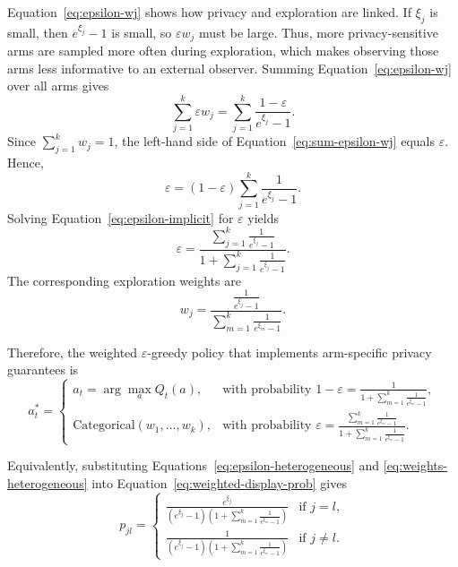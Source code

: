 \documentclass[mksc,nonblindrev]{informs3}
\begin{document}
\begin{APPENDICES}
Equation~\eqref{eq:epsilon-wj} shows how privacy and exploration are linked. If $\xi_j$ is small, then $e^{\xi_j}-1$ is small, so $\varepsilon w_j$ must be large. Thus, more privacy-sensitive arms are sampled more often during exploration, which makes observing those arms less informative to an external observer. Summing Equation~\eqref{eq:epsilon-wj} over all arms gives
\begin{equation}
\label{eq:sum-epsilon-wj}
\sum_{j=1}^k \varepsilon w_j
=
\sum_{j=1}^k
\frac{1-\varepsilon}{e^{\xi_j}-1}.
\end{equation}
Since $\sum_{j=1}^k w_j=1$, the left-hand side of Equation~\eqref{eq:sum-epsilon-wj} equals $\varepsilon$. Hence,
\begin{equation}
\label{eq:epsilon-implicit}
\varepsilon
=
(1-\varepsilon)
\sum_{j=1}^k
\frac{1}{e^{\xi_j}-1}.
\end{equation}
Solving Equation~\eqref{eq:epsilon-implicit} for $\varepsilon$ yields
\begin{equation}
\label{eq:epsilon-heterogeneous}
\varepsilon
=
\frac{
\sum_{j=1}^k \frac{1}{e^{\xi_j}-1}
}{
1+
\sum_{j=1}^k \frac{1}{e^{\xi_j}-1}
}.
\end{equation}
The corresponding exploration weights are
\begin{equation}
\label{eq:weights-heterogeneous}
w_j
=
\frac{
\frac{1}{e^{\xi_j}-1}
}{
\sum_{m=1}^k \frac{1}{e^{\xi_m}-1}
}.
\end{equation}

Therefore, the weighted $\varepsilon$-greedy policy that implements arm-specific privacy guarantees is
\begin{equation}
\label{eq:weighted-policy-final}
a_t^*
=
\begin{cases}
a_t=\arg\max_a Q_t(a), & \text{with probability }
\displaystyle
1-\varepsilon
=
\frac{1}
{1+\sum_{m=1}^k \frac{1}{e^{\xi_m}-1}},\\[16pt]

\text{Categorical}(w_1,\dots,w_k), & \text{with probability }
\displaystyle
\varepsilon
=
\frac{
\sum_{m=1}^k \frac{1}{e^{\xi_m}-1}
}{
1+\sum_{m=1}^k \frac{1}{e^{\xi_m}-1}
}.
\end{cases}
\end{equation}

Equivalently, substituting Equations~\eqref{eq:epsilon-heterogeneous} and \eqref{eq:weights-heterogeneous} into Equation~\eqref{eq:weighted-display-prob} gives
\begin{equation}
\label{eq:weighted-matrix-expanded}
p_{jl}
=
\begin{cases}
\displaystyle
\frac{e^{\xi_j}}
{(e^{\xi_j}-1)\left(1+\sum_{m=1}^k \frac{1}{e^{\xi_m}-1}\right)}
& \text{if } j=l, \\[16pt]
\displaystyle
\frac{1}
{(e^{\xi_j}-1)\left(1+\sum_{m=1}^k \frac{1}{e^{\xi_m}-1}\right)}
& \text{if } j\neq l.
\end{cases}
\end{equation}


\end{APPENDICES}
\end{document}

